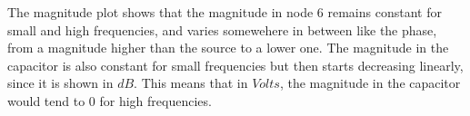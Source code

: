 The magnitude plot shows that the magnitude in node $6$ remains constant for small and high frequencies,
 and varies somewehere in between like the phase, from a magnitude higher than the source to a 
 lower one. The magnitude in the capacitor is also constant for small frequencies but then
  starts decreasing linearly, since it is shown in $dB$. This means that in $Volts$, the
   magnitude in the capacitor would tend to $0$ for high frequencies. 


\newpage







